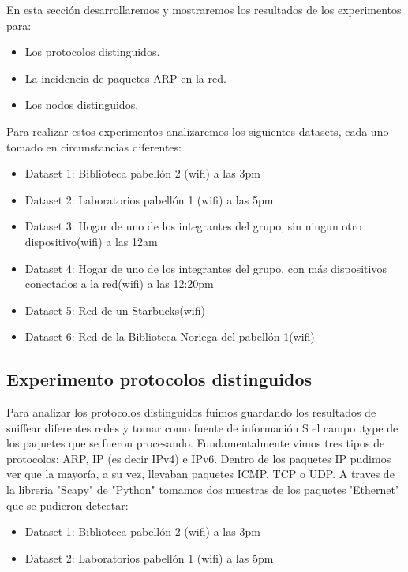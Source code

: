 En esta sección desarrollaremos y mostraremos los resultados de los experimentos para:

\begin{itemize}
\item Los protocolos distinguidos.
\item La incidencia de paquetes ARP en la red.
\item Los nodos distinguidos.
\end{itemize}

Para realizar estos experimentos analizaremos los siguientes datasets, cada uno tomado en circunstancias diferentes:

\begin{itemize}
\item Dataset 1: Biblioteca pabellón 2 (wifi) a las 3pm
\item Dataset 2: Laboratorios pabellón 1 (wifi) a las 5pm
\item Dataset 3: Hogar de uno de los integrantes del grupo, sin ningun otro dispositivo(wifi) a las 12am
\item Dataset 4: Hogar de uno de los integrantes del grupo, con más dispositivos conectados a la red(wifi) a las 12:20pm
\item Dataset 5: Red de un Starbucks(wifi)
\item Dataset 6: Red de la Biblioteca Noriega del pabellón 1(wifi)
\end{itemize}


\subsection{Experimento protocolos distinguidos}

Para analizar los protocolos distinguidos fuimos guardando los resultados de sniffear diferentes redes y tomar como fuente de información S el campo .type de los paquetes que se fueron procesando. Fundamentalmente vimos tres tipos de protocolos: ARP, IP (es decir IPv4) e IPv6. Dentro de los paquetes IP pudimos ver que la mayoría, a su vez, llevaban paquetes ICMP, TCP o UDP. A traves de la libreria "Scapy" de "Python" tomamos dos muestras de los paquetes 'Ethernet' que se pudieron detectar:

\begin{itemize}
\item Dataset 1: Biblioteca pabellón 2 (wifi) a las 3pm
\item Dataset 2: Laboratorios pabellón 1 (wifi) a las 5pm
\end{itemize}

